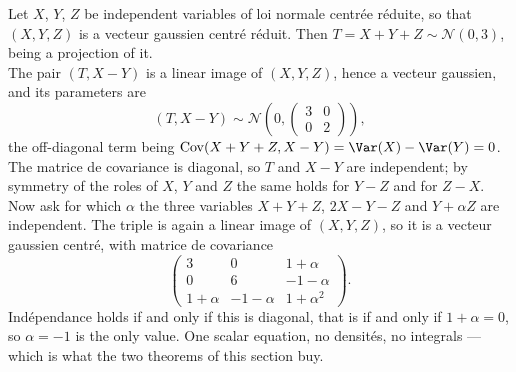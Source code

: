 \begin{example}
Let $X$, $Y$, $Z$ be independent variables of loi normale centrée réduite, so that
$(X,Y,Z)$ is a vecteur gaussien centré réduit. Then
$T = X + Y + Z \sim \mathcal{N}(0,3)$, being a projection of it.\\

The pair $(T, X-Y)$ is a linear image of $(X,Y,Z)$, hence a vecteur gaussien, and
its parameters are
\[
  (T, X-Y) \sim \mathcal{N}\!\left(0,
    \begin{pmatrix} 3 & 0 \\ 0 & 2 \end{pmatrix}\right) ,
\]
the off-diagonal term being
$\Cov(X+Y+Z, X-Y) = \Var(X) - \Var(Y) = 0$. The matrice de covariance is
diagonal, so $T$ and $X-Y$ are independent; by symmetry of the roles of $X$, $Y$
and $Z$ the same holds for $Y-Z$ and for $Z-X$.\\

Now ask for which $\alpha$ the three variables $X+Y+Z$, $2X-Y-Z$ and $Y+\alpha Z$
are independent. The triple is again a linear image of $(X,Y,Z)$, so it is a
vecteur gaussien centré, with matrice de covariance
\[
  \begin{pmatrix}
    3 & 0 & 1+\alpha \\
    0 & 6 & -1-\alpha \\
    1+\alpha & -1-\alpha & 1+\alpha^{2}
  \end{pmatrix} .
\]
Indépendance holds if and only if this is diagonal, that is if and only if
$1 + \alpha = 0$, so $\alpha = -1$ is the only value. One scalar equation, no
densités, no integrals --- which is what the two theorems of this section buy.
\end{example}

